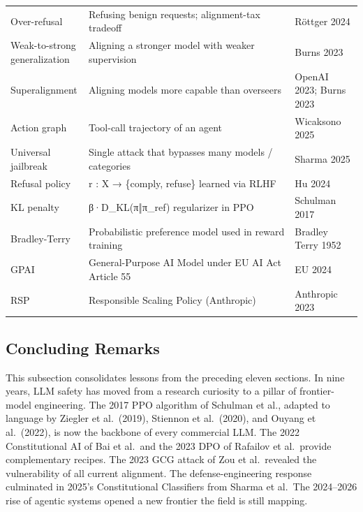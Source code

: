 \documentclass{article}
\begin{document}
\begin{table}[t]
\begin{tabular}{>{\raggedright\arraybackslash}p{0.2248\linewidth}
  >{\raggedright\arraybackslash}p{0.5814\linewidth}
  >{\raggedright\arraybackslash}p{0.1938\linewidth}}
Over-refusal & Refusing benign requests; alignment-tax tradeoff & Röttger 2024 \\
Weak-to-strong generalization & Aligning a stronger model with weaker supervision & Burns 2023 \\
Superalignment & Aligning models more capable than overseers & OpenAI 2023; Burns 2023 \\
Action graph & Tool-call trajectory of an agent & Wicaksono 2025 \\
Universal jailbreak & Single attack that bypasses many models / categories & Sharma 2025 \\
Refusal policy & r : X → \{comply, refuse\} learned via RLHF & Hu 2024 \\
KL penalty & β·D\_KL(π‖π\_ref) regularizer in PPO & Schulman 2017 \\
Bradley-Terry & Probabilistic preference model used in reward training & Bradley Terry 1952 \\
GPAI & General-Purpose AI Model under EU AI Act Article 55 & EU 2024 \\
RSP & Responsible Scaling Policy (Anthropic) & Anthropic 2023 \\
\end{tabular}
\end{table}

\subsection{Concluding Remarks}\label{concluding-remarks}

This subsection consolidates lessons from the preceding eleven sections. In nine years, LLM safety has moved from a research curiosity to a pillar of frontier-model engineering. The 2017 PPO algorithm of Schulman et al., adapted to language by Ziegler et al.~(2019), Stiennon et al.~(2020), and Ouyang et al.~(2022), is now the backbone of every commercial LLM. The 2022 Constitutional AI of Bai et al.~and the 2023 DPO of Rafailov et al.~provide complementary recipes. The 2023 GCG attack of Zou et al.~revealed the vulnerability of all current alignment. The defense-engineering response culminated in 2025's Constitutional Classifiers from Sharma et al.~The 2024--2026 rise of agentic systems opened a new frontier the field is still mapping.
\end{document}

